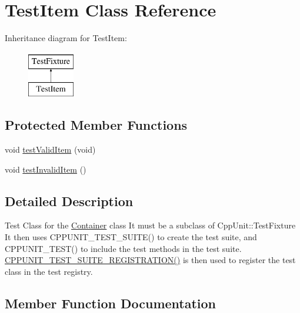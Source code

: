 \hypertarget{class_test_item}{}\section{Test\+Item Class Reference}
\label{class_test_item}
Inheritance diagram for Test\+Item\+:\begin{figure}[H]
\begin{center}
\leavevmode
\includegraphics[height=2.000000cm]{class_test_item}
\end{center}
\end{figure}
\subsection*{Protected Member Functions}
\begin{DoxyCompactItemize}
\item 
void \hyperlink{class_test_item_a477b05d92bd3cce14d4d1815c7c4c166}{test\+Valid\+Item} (void)
\item 
void \hyperlink{class_test_item_acba43791b2802c48296a9e42951e813c}{test\+Invalid\+Item} ()
\end{DoxyCompactItemize}


\subsection{Detailed Description}
Test Class for the \hyperlink{class_container}{Container} class It must be a subclass of Cpp\+Unit\+::\+Test\+Fixture It then uses C\+P\+P\+U\+N\+I\+T\+\_\+\+T\+E\+S\+T\+\_\+\+S\+U\+I\+T\+E() to create the test suite, and C\+P\+P\+U\+N\+I\+T\+\_\+\+T\+E\+S\+T() to include the test methods in the test suite. \hyperlink{_fighter_test_8cpp_a51ede953fdf1bd8b0dae1fbf5077faf5}{C\+P\+P\+U\+N\+I\+T\+\_\+\+T\+E\+S\+T\+\_\+\+S\+U\+I\+T\+E\+\_\+\+R\+E\+G\+I\+S\+T\+R\+A\+T\+I\+O\+N()} is then used to register the test class in the test registry. 

\subsection{Member Function Documentation}
\hypertarget{class_test_item_acba43791b2802c48296a9e42951e813c}{}\label{class_test_item_acba43791b2802c48296a9e42951e813c} 
